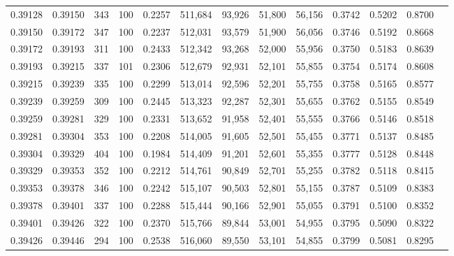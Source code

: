 \begin{tabular}{rrrrrrrrrrrrr}
0.39128 & 0.39150 &    343 & 100 &                                     0.2257 & 511,684 &  93,926 &  51,800 &  56,156 & 0.3742 & 0.5202 & 0.8700 \\
0.39150 & 0.39172 &    347 & 100 &                                     0.2237 & 512,031 &  93,579 &  51,900 &  56,056 & 0.3746 & 0.5192 & 0.8668 \\
0.39172 & 0.39193 &    311 & 100 &                                     0.2433 & 512,342 &  93,268 &  52,000 &  55,956 & 0.3750 & 0.5183 & 0.8639 \\
0.39193 & 0.39215 &    337 & 101 &                                     0.2306 & 512,679 &  92,931 &  52,101 &  55,855 & 0.3754 & 0.5174 & 0.8608 \\
0.39215 & 0.39239 &    335 & 100 &                                     0.2299 & 513,014 &  92,596 &  52,201 &  55,755 & 0.3758 & 0.5165 & 0.8577 \\
0.39239 & 0.39259 &    309 & 100 &                                     0.2445 & 513,323 &  92,287 &  52,301 &  55,655 & 0.3762 & 0.5155 & 0.8549 \\
0.39259 & 0.39281 &    329 & 100 &                                     0.2331 & 513,652 &  91,958 &  52,401 &  55,555 & 0.3766 & 0.5146 & 0.8518 \\
0.39281 & 0.39304 &    353 & 100 &                                     0.2208 & 514,005 &  91,605 &  52,501 &  55,455 & 0.3771 & 0.5137 & 0.8485 \\
0.39304 & 0.39329 &    404 & 100 &                                     0.1984 & 514,409 &  91,201 &  52,601 &  55,355 & 0.3777 & 0.5128 & 0.8448 \\
0.39329 & 0.39353 &    352 & 100 &                                     0.2212 & 514,761 &  90,849 &  52,701 &  55,255 & 0.3782 & 0.5118 & 0.8415 \\
0.39353 & 0.39378 &    346 & 100 &                                     0.2242 & 515,107 &  90,503 &  52,801 &  55,155 & 0.3787 & 0.5109 & 0.8383 \\
0.39378 & 0.39401 &    337 & 100 &                                     0.2288 & 515,444 &  90,166 &  52,901 &  55,055 & 0.3791 & 0.5100 & 0.8352 \\
0.39401 & 0.39426 &    322 & 100 &                                     0.2370 & 515,766 &  89,844 &  53,001 &  54,955 & 0.3795 & 0.5090 & 0.8322 \\
0.39426 & 0.39446 &    294 & 100 &                                     0.2538 & 516,060 &  89,550 &  53,101 &  54,855 & 0.3799 & 0.5081 & 0.8295 \\

\end{tabular}
